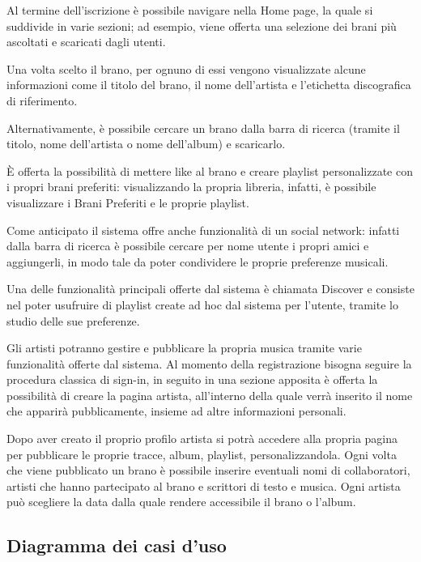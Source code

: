 Al termine dell’iscrizione è possibile navigare nella Home page, la quale si suddivide in varie sezioni; ad esempio, viene offerta una selezione dei brani più ascoltati e scaricati dagli utenti. 

Una volta scelto il brano, per ognuno di essi vengono visualizzate alcune informazioni come il titolo del brano, il nome dell’artista e l’etichetta discografica di riferimento.

Alternativamente, è possibile cercare un brano dalla barra di ricerca (tramite il titolo, nome dell’artista o nome dell’album) e scaricarlo.

È offerta la possibilità di mettere like al brano e creare playlist personalizzate con i propri brani preferiti: visualizzando la propria libreria, infatti, è possibile visualizzare i Brani Preferiti e le proprie playlist. 

Come anticipato il sistema offre anche funzionalità di un social network: infatti dalla barra di ricerca è possibile cercare per nome utente i propri amici e aggiungerli, in modo tale da poter condividere le proprie preferenze musicali. 

Una delle funzionalità principali offerte dal sistema è chiamata Discover e consiste nel poter usufruire di playlist create ad hoc dal sistema per l’utente, tramite lo studio delle sue preferenze. 

Gli artisti potranno gestire e pubblicare la propria musica tramite varie funzionalità offerte dal sistema. Al momento della registrazione bisogna seguire la procedura classica di sign-in, in seguito in una sezione apposita è offerta la possibilità di creare la pagina artista, all’interno della quale verrà inserito il nome che apparirà pubblicamente, insieme ad altre informazioni personali. 

Dopo aver creato il proprio profilo artista si potrà accedere alla propria pagina per pubblicare le proprie tracce, album, playlist, personalizzandola. Ogni volta che viene pubblicato un brano è possibile inserire eventuali nomi di collaboratori, artisti che hanno partecipato al brano e scrittori di testo e musica. Ogni artista può scegliere la data dalla quale rendere accessibile il brano o l’album.







\newpage
\subsection{Diagramma dei casi d'uso}

